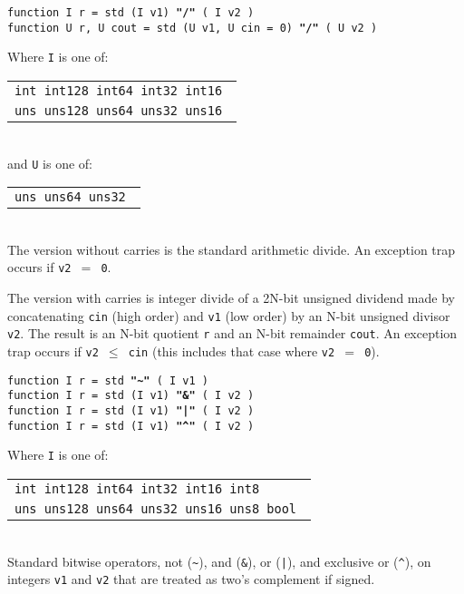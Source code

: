 \documentclass[12pt]{article}
\newcommand{\ttkey}[1]{{\tt \bfseries #1}}
\newenvironment{indpar}[1][0.3in]%
	{\begin{list}{}%
		     {\setlength{\itemsep}{0in}%
		      \setlength{\topsep}{0in}%
		      \setlength{\parsep}{1ex}%
		      \setlength{\labelwidth}{#1}%
		      \setlength{\leftmargin}{#1}%
		      \addtolength{\leftmargin}{\labelsep}}%
	 \item}%
	{\end{list}}
\begin{document}
{\tt function I r = std (I v1) \ttkey{"/"} ( I v2 )} \\
{\tt function U r, U cout = std (U v1, U cin = 0) \ttkey{"/"} ( U v2 )}
\begin{indpar}
Where {\tt I} is one of:
	\begin{tabular}[t]{l}
	\tt int  int128 int64  int32  int16 \\
	\tt uns  uns128 uns64  uns32  uns16 \\
	\end{tabular}
\\[1ex]
and {\tt U} is one of:
	\begin{tabular}[t]{l}
	\tt uns  uns64  uns32 \\
	\end{tabular}
\\[1ex]
The version without carries is the standard arithmetic divide.
An exception trap occurs if {\tt v2 $=$ 0}.

The version with carries is integer divide of a 2N-bit unsigned
dividend made by concatenating {\tt cin} (high order) and
{\tt v1} (low order) by an N-bit unsigned divisor {\tt v2}.  The result
is an N-bit quotient {\tt r} and an N-bit remainder {\tt cout}.
An exception trap occurs if {\tt v2 $\leq$ cin} (this includes
that case where {\tt v2 $=$ 0}).

\end{indpar}

{\tt function I r = std        \ttkey{"\textasciitilde"} ( I v1 )} \\
{\tt function I r = std (I v1) \ttkey{"\&"} ( I v2 )} \\
{\tt function I r = std (I v1) \ttkey{"|"} ( I v2 )} \\
{\tt function I r = std (I v1) \ttkey{"\textasciicircum"} ( I v2 )}
\begin{indpar}
Where {\tt I} is one of:
	\begin{tabular}[t]{l}
	\tt int  int128 int64  int32  int16 int8 \\
	\tt uns  uns128 uns64  uns32  uns16 uns8 bool \\
	\end{tabular}
\\[1ex]
Standard bitwise operators, not ({\tt \textasciitilde}),
and ({\tt \&}), or ({\tt |}), and exclusive or ({\tt \textasciicircum}),
on integers {\tt v1} and {\tt v2}
that are treated as two's complement if signed.
\end{indpar}
\end{document}
